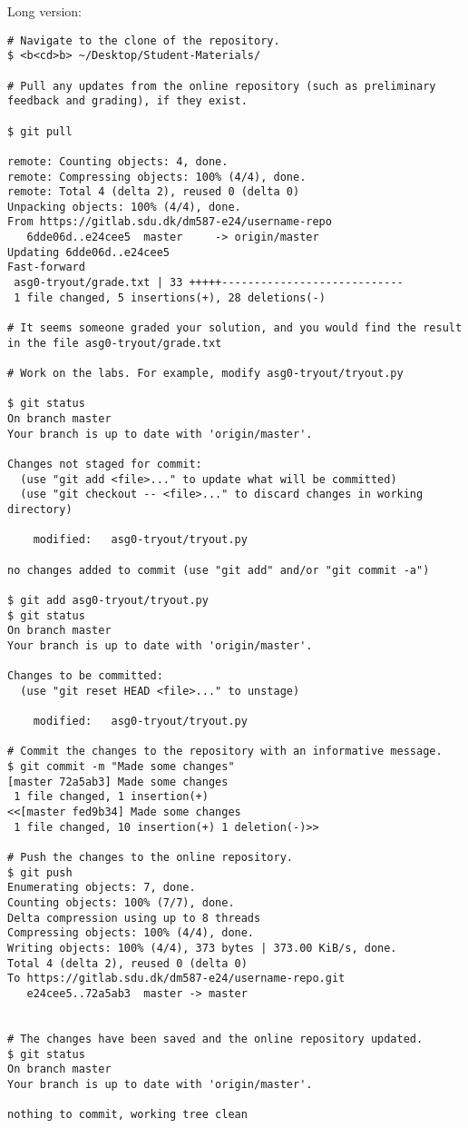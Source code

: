 Long version:
\begin{lstlisting}
# Navigate to the clone of the repository.
$ <b<cd>b> ~/Desktop/Student-Materials/

# Pull any updates from the online repository (such as preliminary feedback and grading), if they exist.

$ git pull

remote: Counting objects: 4, done.
remote: Compressing objects: 100% (4/4), done.
remote: Total 4 (delta 2), reused 0 (delta 0)
Unpacking objects: 100% (4/4), done.
From https://gitlab.sdu.dk/dm587-e24/username-repo
   6dde06d..e24cee5  master     -> origin/master
Updating 6dde06d..e24cee5
Fast-forward
 asg0-tryout/grade.txt | 33 +++++----------------------------
 1 file changed, 5 insertions(+), 28 deletions(-)

# It seems someone graded your solution, and you would find the result in the file asg0-tryout/grade.txt
 
# Work on the labs. For example, modify asg0-tryout/tryout.py

$ git status
On branch master
Your branch is up to date with 'origin/master'.

Changes not staged for commit:
  (use "git add <file>..." to update what will be committed)
  (use "git checkout -- <file>..." to discard changes in working directory)

	modified:   asg0-tryout/tryout.py

no changes added to commit (use "git add" and/or "git commit -a")

$ git add asg0-tryout/tryout.py
$ git status
On branch master
Your branch is up to date with 'origin/master'.

Changes to be committed:
  (use "git reset HEAD <file>..." to unstage)

	modified:   asg0-tryout/tryout.py

# Commit the changes to the repository with an informative message.
$ git commit -m "Made some changes"
[master 72a5ab3] Made some changes
 1 file changed, 1 insertion(+)
<<[master fed9b34] Made some changes
 1 file changed, 10 insertion(+) 1 deletion(-)>>

# Push the changes to the online repository.
$ git push
Enumerating objects: 7, done.
Counting objects: 100% (7/7), done.
Delta compression using up to 8 threads
Compressing objects: 100% (4/4), done.
Writing objects: 100% (4/4), 373 bytes | 373.00 KiB/s, done.
Total 4 (delta 2), reused 0 (delta 0)
To https://gitlab.sdu.dk/dm587-e24/username-repo.git
   e24cee5..72a5ab3  master -> master


# The changes have been saved and the online repository updated.
$ git status
On branch master
Your branch is up to date with 'origin/master'.

nothing to commit, working tree clean
\end{lstlisting}

